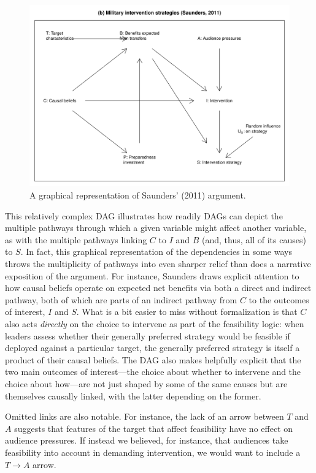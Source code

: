 \documentclass[12pt,]{book}
\begin{document}
\begin{figure}

{\centering \includegraphics[width=.7\textwidth]{ii_files/figure-latex/unnamed-chunk-9-1} 

}

\caption{\label{fig:DAGSaunders} A graphical representation of Saunders' (2011) argument.}\label{fig:unnamed-chunk-9}
\end{figure}

This relatively complex DAG illustrates how readily DAGs can depict the multiple pathways through which a given variable might affect another variable, as with the multiple pathways linking \(C\) to \(I\) and \(B\) (and, thus, all of its causes) to \(S\). In fact, this graphical representation of the dependencies in some ways throws the multiplicity of pathways into even sharper relief than does a narrative exposition of the argument. For instance, Saunders draws explicit attention to how causal beliefs operate on expected net benefits via both a direct and indirect pathway, both of which are parts of an indirect pathway from \(C\) to the outcomes of interest, \(I\) and \(S\). What is a bit easier to miss without formalization is that \(C\) also acts \emph{directly} on the choice to intervene as part of the feasibility logic: when leaders assess whether their generally preferred strategy would be feasible if deployed against a particular target, the generally preferred strategy is itself a product of their causal beliefs. The DAG also makes helpfully explicit that the two main outcomes of interest---the choice about whether to intervene and the choice about how---are not just shaped by some of the same causes but are themselves causally linked, with the latter depending on the former.

Omitted links are also notable. For instance, the lack of an arrow between \(T\) and \(A\) suggests that features of the target that affect feasibility have no effect on audience pressures. If instead we believed, for instance, that audiences take feasibility into account in demanding intervention, we would want to include a \(T \rightarrow A\) arrow.
\end{document}
